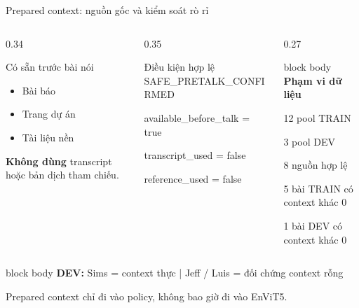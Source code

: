 \documentclass[aspectratio=169,11pt]{beamer}
\begin{document}
\begin{frame}{Prepared context: nguồn gốc và kiểm soát rò rỉ}
  \begin{columns}[T,onlytextwidth]
    \begin{column}{0.34\textwidth}
      \begin{block}{Có sẵn trước bài nói}
        \small
        \begin{itemize}
          \setlength\itemsep{0.35em}
          \item Bài báo
          \item Trang dự án
          \item Tài liệu nền
        \end{itemize}
      \end{block}
      \scriptsize\textbf{Không dùng} transcript hoặc bản dịch tham chiếu.
    \end{column}
    \begin{column}{0.35\textwidth}
      \begin{block}{Điều kiện hợp lệ}
        \scriptsize\ttfamily
        SAFE\_PRETALK\_CONFIRMED\par
        available\_before\_talk = true\par
        transcript\_used = false\par
        reference\_used = false
      \end{block}
    \end{column}
    \begin{column}{0.27\textwidth}
      \begin{beamercolorbox}[rounded=true,sep=0.45em]{block body}
        \scriptsize
        \textbf{Phạm vi dữ liệu}\par
        12 pool TRAIN\par
        3 pool DEV\par
        8 nguồn hợp lệ\par
        5 bài TRAIN có context khác 0\par
        1 bài DEV có context khác 0
      \end{beamercolorbox}
    \end{column}
  \end{columns}
  \vspace{0.55em}
  \begin{beamercolorbox}[rounded=true,sep=0.55em,center]{block body}
    \textbf{DEV:} Sims = context thực \quad | \quad Jeff / Luis = đối chứng context rỗng
  \end{beamercolorbox}
  \vfill
  \centering\alert{Prepared context chỉ đi vào policy, không bao giờ đi vào EnViT5.}
\end{frame}
\end{document}
